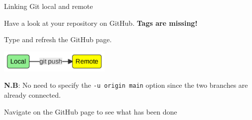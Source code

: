 \documentclass[10pt]{beamer}
\begin{document}
\begin{frame}[fragile]{Linking Git local and remote}

Have a look at your repository on GitHub. \textbf{Tags are missing!}

Type  and refresh the GitHub page.

\begin{center}
    \includegraphics[width=0.4\textwidth]{mermaid/mermaid-figure-14.png}
\end{center}

\textbf{N.B}: No need to specify the \verb+-u origin main+ option since the two branches are already connected.

Navigate on the GitHub page to see what has been done

\end{frame}
\end{document}
